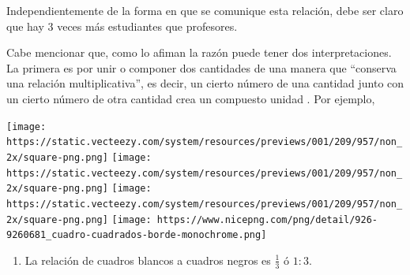 \documentclass[
]{book}
\providecommand{\tightlist}{%
  \setlength{\itemsep}{0pt}\setlength{\parskip}{0pt}}
\begin{document}
Independientemente de la forma en que se comunique esta relación, debe ser claro que hay 3 veces más estudiantes que profesores.

Cabe mencionar que, como lo afiman \citep{petit2020focus} la razón puede tener dos interpretaciones. La primera es por
unir o componer dos cantidades de una manera que ``conserva una relación multiplicativa'', es decir, un cierto número de una cantidad junto con un cierto número de otra cantidad crea un compuesto unidad \citep{beckmann2017mathematics}. Por ejemplo,

\texttt{[image: https://static.vecteezy.com/system/resources/previews/001/209/957/non\_2x/square-png.png]} \texttt{[image: https://static.vecteezy.com/system/resources/previews/001/209/957/non\_2x/square-png.png]} \texttt{[image: https://static.vecteezy.com/system/resources/previews/001/209/957/non\_2x/square-png.png]} \texttt{[image: https://www.nicepng.com/png/detail/926-9260681\_cuadro-cuadrados-borde-monochrome.png]}

\begin{enumerate}
\def\labelenumi{\arabic{enumi}.}
\tightlist
\item
  La relación de cuadros blancos a cuadros negros es \(\frac{1}{3}\) ó \(1:3\).
\end{enumerate}
\end{document}
